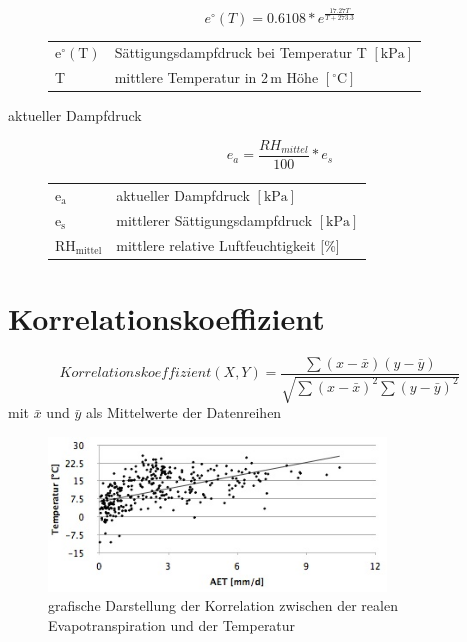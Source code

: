 \begin{appendix}
\begin{description}
\begin{equation}
\label{eq:enull}
e^{\circ}(T)=0.6108*e^{\frac{17.27T}{T+273.3}}
\end{equation}
\begin{table}[H]
\centering
\begin{tabular}{ll}
$\mathrm{e^{\circ}(T)}$ & Sättigungsdampfdruck bei Temperatur T $\mathrm{[kPa]}$\\
T & mittlere Temperatur in 2\,m Höhe $\mathrm{[^{\circ}C]}$\\\end{tabular}
\end{table}


\item[aktueller Dampfdruck]
\begin{equation}
\label{eq:ea}
e_a=\frac{RH_{mittel}}{100}*e_s
\end{equation}
\begin{table}[H]
\centering
\begin{tabular}{ll}
$\mathrm{e_a}$ & aktueller Dampfdruck $\mathrm{[kPa]}$\\
$\mathrm{e_s}$ & mittlerer Sättigungsdampfdruck $\mathrm{[kPa]}$\\
$\mathrm{RH_{mittel}}$ & mittlere relative Luftfeuchtigkeit [\%]\\
\end{tabular}
\end{table}

\end{description}

\section{Korrelationskoeffizient}
\label{sec:korrelation}
$$Korrelationskoeffizient(X,Y)=\frac{\sum (x-\bar{x})(y-\bar{y})}{\sqrt{\sum (x-\bar{x})^2\sum (y-\bar{y})^2}} $$
\center mit $\bar{x}$ und $\bar{y}$ als Mittelwerte der Datenreihen

\begin{figure}[H]
\centering
\includegraphics[width=0.8\textwidth]{figures/korr_temp.jpg}
\caption{grafische Darstellung der Korrelation zwischen der realen Evapotranspiration und der Temperatur}
\label{fig:korr_temp}
\end{figure}


\end{appendix}
